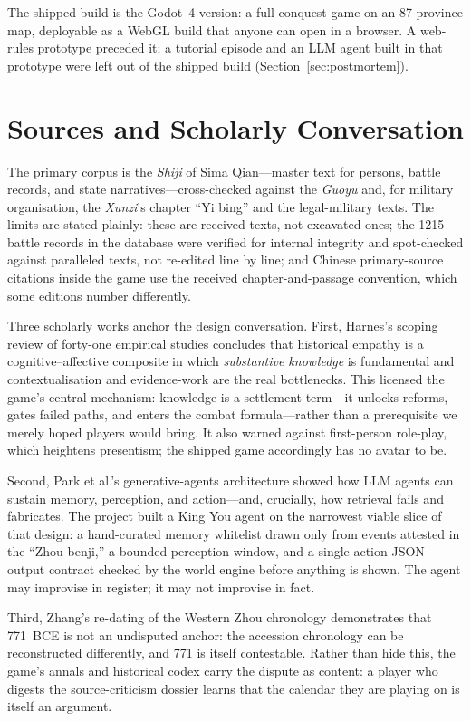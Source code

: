 \documentclass[12pt,a4paper]{article}
\begin{document}
The shipped build is the Godot~4 version: a full conquest game on an
87-province map, deployable as a WebGL build that anyone can open in a
browser. A web-rules prototype preceded it; a tutorial episode and an LLM
agent built in that prototype were left out of the shipped build
(Section~\ref{sec:postmortem}).

\section{Sources and Scholarly Conversation}

The primary corpus is the \emph{Shiji} of Sima Qian---master text for
persons, battle records, and state narratives---cross-checked against the
\emph{Guoyu}\autocite{guoyu} and, for military organisation, the
\emph{Xunzi}'s chapter ``Yi bing'' and the legal-military texts. The limits
are stated plainly: these are received texts, not excavated ones; the
1215 battle records in the database were verified for internal integrity and
spot-checked against paralleled texts, not re-edited line by line; and
Chinese primary-source citations inside the game use the received
chapter-and-passage convention, which some editions number differently.

Three scholarly works anchor the design conversation. First, Harnes's scoping
review of forty-one empirical studies concludes that historical empathy is a
cognitive--affective composite in which \emph{substantive knowledge} is
fundamental and contextualisation and evidence-work are the real
bottlenecks.\autocite{harnes2025empathy} This licensed the game's central
mechanism: knowledge is a settlement term---it unlocks reforms, gates failed
paths, and enters the combat formula---rather than a prerequisite we merely
hoped players would bring. It also warned against first-person role-play,
which heightens presentism; the shipped game accordingly has no avatar to be.

Second, Park et al.'s generative-agents architecture showed how LLM agents
can sustain memory, perception, and action---and, crucially, how retrieval
fails and fabricates.\autocite{park2023generative} The project built a King
You agent on the narrowest viable slice of that design: a hand-curated memory
whitelist drawn only from events attested in the ``Zhou benji,'' a bounded
perception window, and a single-action JSON output contract checked by the
world engine before anything is shown. The agent may improvise in register;
it may not improvise in fact.

Third, Zhang's re-dating of the Western Zhou chronology demonstrates that
771~BCE is not an undisputed anchor: the accession chronology can be
reconstructed differently, and 771 is itself contestable.\autocite{zhang2023chronology}
Rather than hide this, the game's annals and historical codex carry the
dispute as content: a player who digests the source-criticism dossier learns
that the calendar they are playing on is itself an argument.
\end{document}
